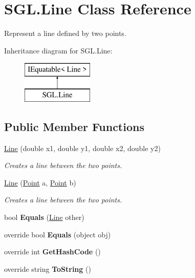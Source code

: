 \hypertarget{class_s_g_l_1_1_line}{}\section{S\+G\+L.\+Line Class Reference}
\label{class_s_g_l_1_1_line}


Represent a line defined by two points.  


Inheritance diagram for S\+G\+L.\+Line\+:\begin{figure}[H]
\begin{center}
\leavevmode
\includegraphics[height=2.000000cm]{class_s_g_l_1_1_line}
\end{center}
\end{figure}
\subsection*{Public Member Functions}
\begin{DoxyCompactItemize}
\item 
\mbox{\hyperlink{class_s_g_l_1_1_line_a8223479d92d17240ca099e57a3db2fb8}{Line}} (double x1, double y1, double x2, double y2)
\begin{DoxyCompactList}\small\item\em Creates a line between the two points. \end{DoxyCompactList}\item 
\mbox{\hyperlink{class_s_g_l_1_1_line_aa8638f980f735da597505f73105c8b44}{Line}} (\mbox{\hyperlink{struct_s_g_l_1_1_point}{Point}} a, \mbox{\hyperlink{struct_s_g_l_1_1_point}{Point}} b)
\begin{DoxyCompactList}\small\item\em Creates a line between the two points. \end{DoxyCompactList}\item 
\mbox{\label{class_s_g_l_1_1_line_a843197ff24817c39a8640ef6a0fce6a6}} 
bool {\bfseries Equals} (\mbox{\hyperlink{class_s_g_l_1_1_line}{Line}} other)
\item 
\mbox{\label{class_s_g_l_1_1_line_ac22009bbb59798ccdc5d456e8f460687}} 
override bool {\bfseries Equals} (object obj)
\item 
\mbox{\label{class_s_g_l_1_1_line_a0e1a9dfda6f68cc061f55d64364cde9c}} 
override int {\bfseries Get\+Hash\+Code} ()
\item 
\mbox{\label{class_s_g_l_1_1_line_a10d26aa2ac7871020125a44032600455}} 
override string {\bfseries To\+String} ()
\end{DoxyCompactItemize}
